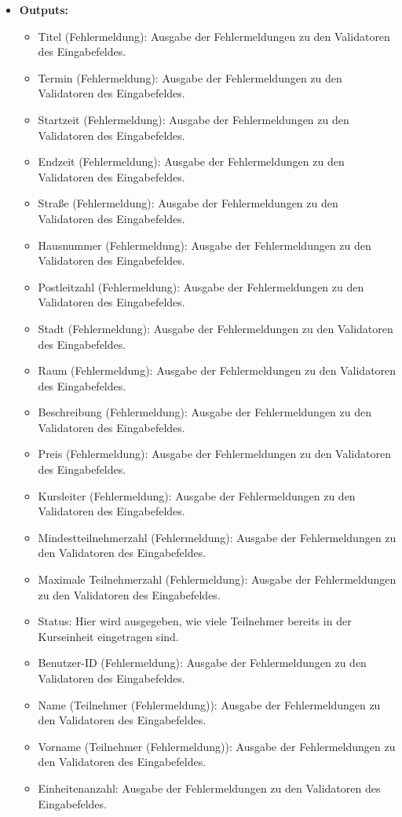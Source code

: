 \begin{itemize}
			\item \textbf{Outputs:}
				\begin{itemize}
					\item Titel (Fehlermeldung): Ausgabe der Fehlermeldungen zu den Validatoren des Eingabefeldes.
					\item Termin (Fehlermeldung): Ausgabe der Fehlermeldungen zu den Validatoren des Eingabefeldes.
					\item Startzeit (Fehlermeldung): Ausgabe der Fehlermeldungen zu den Validatoren des Eingabefeldes.
					\item Endzeit (Fehlermeldung): Ausgabe der Fehlermeldungen zu den Validatoren des Eingabefeldes.
					\item Straße (Fehlermeldung): Ausgabe der Fehlermeldungen zu den Validatoren des Eingabefeldes.
					\item Hausnummer (Fehlermeldung): Ausgabe der Fehlermeldungen zu den Validatoren des Eingabefeldes.
					\item Postleitzahl (Fehlermeldung): Ausgabe der Fehlermeldungen zu den Validatoren des Eingabefeldes.
					\item Stadt (Fehlermeldung): Ausgabe der Fehlermeldungen zu den Validatoren des Eingabefeldes.
					\item Raum (Fehlermeldung): Ausgabe der Fehlermeldungen zu den Validatoren des Eingabefeldes.
					\item Beschreibung (Fehlermeldung): Ausgabe der Fehlermeldungen zu den Validatoren des Eingabefeldes.
					\item Preis (Fehlermeldung): Ausgabe der Fehlermeldungen zu den Validatoren des Eingabefeldes.
					\item Kursleiter (Fehlermeldung): Ausgabe der Fehlermeldungen zu den Validatoren des Eingabefeldes.
					\item Mindestteilnehmerzahl (Fehlermeldung): Ausgabe der Fehlermeldungen zu den Validatoren des Eingabefeldes.
					\item Maximale Teilnehmerzahl (Fehlermeldung): Ausgabe der Fehlermeldungen zu den Validatoren des Eingabefeldes.
					\item Status: Hier wird ausgegeben, wie viele Teilnehmer bereits in der Kurseinheit eingetragen sind.
					\item Benutzer-ID (Fehlermeldung): Ausgabe der Fehlermeldungen zu den Validatoren des Eingabefeldes.
					\item Name (Teilnehmer (Fehlermeldung)): Ausgabe der Fehlermeldungen zu den Validatoren des Eingabefeldes.
					\item Vorname (Teilnehmer (Fehlermeldung)): Ausgabe der Fehlermeldungen zu den Validatoren des Eingabefeldes.
					\item Einheitenanzahl: Ausgabe der Fehlermeldungen zu den Validatoren des Eingabefeldes.
				\end{itemize}
				

\end{itemize}
